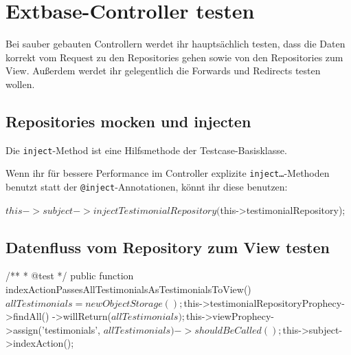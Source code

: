 \documentclass[a4paper,11pt,headsepline]{scrartcl}
\begin{document}
\pagebreak
\section{Extbase-Controller testen}

Bei sauber gebauten Controllern werdet ihr hauptsächlich testen, dass die Daten korrekt vom Request zu den Repositories gehen sowie von den Repositories zum View. Außerdem werdet ihr gelegentlich die Forwards und Redirects testen wollen.

\subsection{Repositories mocken und injecten}


Die \texttt{inject}-Method ist eine Hilfsmethode der Testcase-Basisklasse.

Wenn ihr für bessere Performance im Controller explizite \texttt{inject…}-Methoden benutzt statt der \texttt{@inject}-Annotationen, könnt ihr diese benutzen:

\begin{phpcode}
$this->subject->injectTestimonialRepository($this->testimonialRepository);
\end{phpcode}


\subsection{Datenfluss vom Repository zum View testen}

\begin{phpcode}
/**
  * @test
  */
public function indexActionPassesAllTestimonialsAsTestimonialsToView()
{
    $allTestimonials = new ObjectStorage();
    $this->testimonialRepositoryProphecy->findAll()
        ->willReturn($allTestimonials);

    $this->viewProphecy->assign('testimonials', $allTestimonials)
        ->shouldBeCalled();

    $this->subject->indexAction();
}
\end{phpcode}
\end{document}
